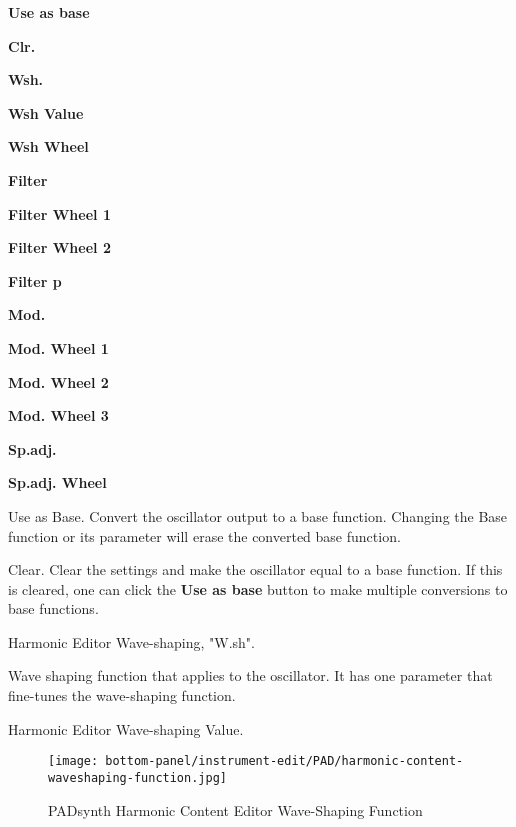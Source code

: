    \begin{enumber}
      \item \textbf{Use as base}
      \item \textbf{Clr.}
      \item \textbf{Wsh.}
      \item \textbf{Wsh Value}
      \item \textbf{Wsh Wheel}
      \item \textbf{Filter}
      \item \textbf{Filter Wheel 1}
      \item \textbf{Filter Wheel 2}
      \item \textbf{Filter p}
      \item \textbf{Mod.}
      \item \textbf{Mod. Wheel 1}
      \item \textbf{Mod. Wheel 2}
      \item \textbf{Mod. Wheel 3}
      \item \textbf{Sp.adj.}
      \item \textbf{Sp.adj. Wheel}
   \end{enumber}

   \setcounter{ItemCounter}{0}      %

   Use as Base.
   Convert the oscillator output to a base function. Changing the Base
   function or its parameter will erase the converted base function. 

   Clear.
   Clear the settings and make the oscillator equal to a base function. If
   this is cleared, one can click the \textbf{Use as base} button to make
   multiple conversions to base functions. 

   Harmonic Editor Wave-shaping, "W.sh".

   Wave shaping function that applies to the oscillator.
   It has one parameter that fine-tunes the wave-shaping function. 

   Harmonic Editor Wave-shaping Value.

\begin{figure}[H]
   \centering 
   \texttt{[image: bottom-panel/instrument-edit/PAD/harmonic-content-waveshaping-function.jpg]}
   \caption{PADsynth Harmonic Content Editor Wave-Shaping Function}
   \label{fig:padsynth_harmonic_content_editor_waveshaping_function}
\end{figure}

